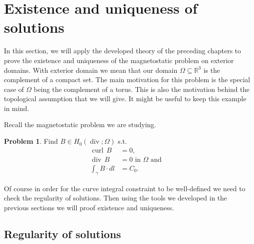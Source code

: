 \documentclass[12pt,a4paper]{article}
\numberwithin{equation}{subsection}
\numberwithin{lemma}{subsection}
\theoremstyle{definition}
\newtheorem{problem}[lemma]{Problem}
\DeclareMathOperator{\curl}{curl}
\DeclareMathOperator{\diver}{div}
\newcommand{\real}{\mathbb{R}}
\begin{document}
\section{Existence and uniqueness of solutions}\label{sec:existence_and_uniqueness}

In this section, we will apply the developed theory of the preceding chapters
to prove the existence and uniqueness of the magnetostatic problem 
on exterior domains. With exterior domain we mean that our domain $\Omega \subseteq \real^3$
is the complement of a compact set. The main motivation for this problem is 
the special case of $\Omega$ being the complement of a torus. 
This is also the motivation behind the
topological assumption that we will give. It might be useful to keep this
example in mind.

Recall the magnetostatic problem we are studying.

\begin{problem}\label{prob:magnetostatic_problem}
    Find $B \in H_0(\diver;\Omega)$ s.t.
    \begin{align}
        \curl \, B &= 0, \\ 
        \diver \, B  &= 0 \text{ in } \Omega \text{ and }\\
        \int_\gamma B \cdot dl &= C_0.
    \end{align}
\end{problem}

Of course in order for the curve integral constraint to be well-defined 
we need to check the regularity of solutions. Then using the tools we developed
in the previous sections we will proof existence and uniqueness.

\subsection{Regularity of solutions}\label{sec:regularity_of_solutions}
\end{document}
